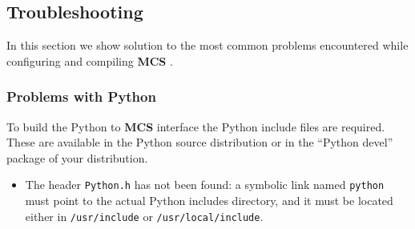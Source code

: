 \documentclass[12pt,titlepage]{article}
\newcommand{\mcs}{\textbf{MCS} }
\begin{document}
\subsection{Troubleshooting}
In this section we show solution to the most common problems
encountered while configuring and compiling \mcs.

%
\subsubsection{Problems with Python}
To build the Python to \mcs interface the Python include files are
required. These are available in the Python source distribution or in
the ``Python devel'' package of your distribution.

\begin{itemize}
\item The header \verb|Python.h| has not been found: a symbolic link
  named \verb|python| must point to the actual Python includes
  directory, and it must be located either in \verb|/usr/include| or
  \verb|/usr/local/include|.
\end{itemize}
\end{document}
